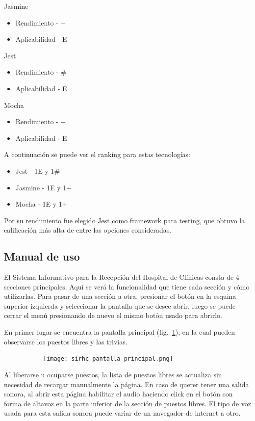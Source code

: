 \documentclass[twoside]{article}
\begin{document}
Jasmine
\begin{itemize}
    \item Rendimiento - +
    \item Aplicabilidad - E
\end{itemize}
Jest
\begin{itemize}
    \item Rendimiento - \#
    \item Aplicabilidad - E 
\end{itemize}
Mocha
\begin{itemize}
    \item Rendimiento - +
    \item Aplicabilidad - E
\end{itemize}
A continuación se puede ver el ranking para estas tecnologías:
\begin{itemize}
    \item Jest -  1E y 1\#
    \item Jasmine - 1E y 1+
    \item Mocha - 1E y 1+
\end{itemize}
Por su rendimiento fue elegido Jest como framework para testing, que obtuvo la calificación más alta de entre las opciones consideradas.
\newpage
\subsection{Manual de uso}
El Sistema Informativo para la Recepción del Hospital de Clínicas consta de 4 secciones principales. Aquí se verá la funcionalidad que tiene cada sección y cómo utilizarlas. Para pasar de una sección a otra, presionar el botón en la esquina superior izquierda y seleccionar la pantalla que se desee abrir, luego se puede cerrar el menú presionando de nuevo el mismo botón usado para abrirlo.

En primer lugar se encuentra la pantalla principal (fig.~\ref{fig:pantallaPrincipalManual}), en la cual pueden observarse los puestos libres y las trivias.
\begin{figure}[H]
	\caption{Interfaz de la pantalla principal del sistema}
    \begin{subfigure}{1\textwidth}
	\texttt{[image: sirhc pantalla principal.png]}
    \end{subfigure}
	\label{fig:pantallaPrincipalManual}
\end{figure}
\vspace{-1.0\baselineskip}

Al liberarse u ocuparse puestos, la lista de puestos libres se actualiza sin necesidad de recargar manualmente la página. En caso de querer tener una salida sonora, al abrir esta página habilitar el audio haciendo click en el botón con forma de altavoz en la parte inferior de la sección de puestos libres. El tipo de voz usada para esta salida sonora puede variar de un navegador de internet a otro.
\end{document}
